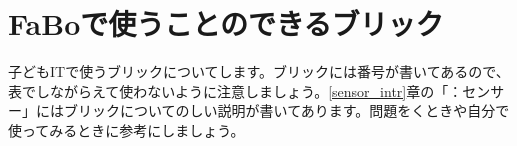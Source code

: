\documentclass[text05.tex]{subfiles}
\begin{document}
\section{FaBoで使うことのできるブリック}
子どもITで使うブリックについてします。ブリックには番号が書いてあるので、表でしながらえて使わないように注意しましょう。\ref{sensor_intr}章の「：センサー」にはブリックについてのしい説明が書いてあります。問題をくときや自分で使ってみるときに参考にしましょう。\\

\newlength{\colA}
\setlength{\colA}{0.15\columnwidth}
\newlength{\colB}
\setlength{\colB}{0.15\columnwidth}
\newlength{\colC}
\setlength{\colC}{0.3\columnwidth}
\newlength{\colD}
\setlength{\colD}{0.2\columnwidth}
\newlength{\colE}
\setlength{\colE}{0.07\columnwidth}
\end{document}
